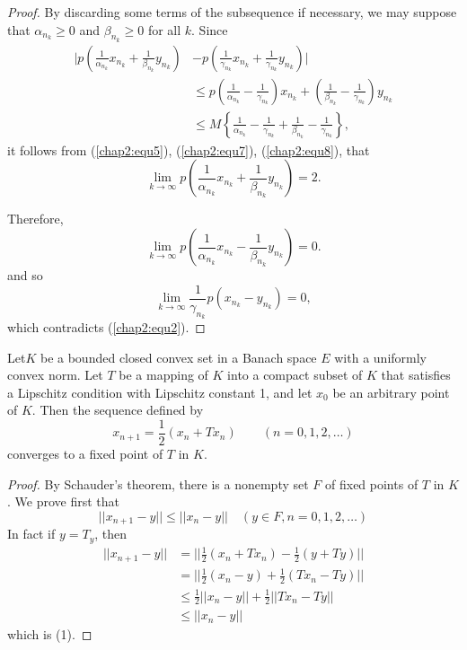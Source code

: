 \begin{proof}
By discarding some terms of the subsequence if necessary, we may
suppose that $\alpha_{n_k} \ge 0$ and $\beta_{n_k} \ge 0$ for all
$k$. Since 
\begin{align*}
\bigg| p \left(\frac{1}{\alpha_{n_k}} x_{n_k} + \frac{1}{\beta_{n_k}} y_{n
  _k} \right) & - p \left(\frac{1}{\gamma_{n_k}} x_{n_k} + \frac{1}{\gamma_{n_k}}
y_{n_k} \right) \bigg| \\
  & \le p \left(\frac{1}{\alpha_{n_k}} - \frac{1}{\gamma_{n_k}} \right) x_{n_k} +
  \left(\frac{1}{\beta_{n_k}} - \frac{1}{\gamma_{ n_k}}\right) y_{n_k}\\ 
  & \le M \left\{ \frac{1}{\alpha_{n_k}} - \frac{1}{\gamma_{n_k}} +
  \frac{1}{\beta_{n_k}} - \frac{1}{\gamma_{n_k}} \right\}, 
\end{align*}
it follows from (\ref{chap2:equ5}), (\ref{chap2:equ7}),
(\ref{chap2:equ8}), that 
$$
\lim_{k \to \infty} p \left(\frac{1}{\alpha_{n_k}} x_{n_k} +
\frac{1}{\beta_{n_k}} y_{n_k} \right) = 2. 
$$

Therefore,
$$
\lim_{k \to \infty} p \left(\frac{1}{\alpha_{n_k}} x_{n_k} -
\frac{1}{\beta_{n_k}} y_{n_k} \right) = 0.
$$
and so
$$
\lim_{k \to \infty} \frac{1}{\gamma_{n_k}} p(x_{n_k} - y_{n_k}) = 
0, 
$$
which contradicts (\ref{chap2:equ2}).
\end{proof}

\begin{thmm}[Krashoselsk\u{u}]\label{chap2:thm2.6}%
  Let\pageoriginale $K$ be a bounded closed convex set in a Banach
  space $E$ with a 
  uniformly convex norm. Let $T$ be a mapping of $K$ into a compact
  subset of $K$ that satisfies a Lipschitz condition with Lipschitz
  constant 1, and let $x_0$ be an arbitrary point of $K$. Then the
  sequence defined by  
  $$
  x_{n + 1} = \frac{1}{2} (x_n + Tx_n) \qquad (n =0, 1,2, \ldots )
  $$
  converges to a fixed point of $T$ in $K$.
\end{thmm}

\begin{proof}
  By Schauder's theorem, there is a nonempty set $F$ of fixed points
  of $T$ in $K$. We prove first that 
  $$
  || x_{n + 1} - y || \le || x_n - y || \quad (y \in F, n = 0, 1,2, \ldots)
  $$
  In fact if $y = T_y$, then
  \begin{align*}
  || x_{n + 1} - y || & = || \frac{1}{2} (x_n + Tx_n) - \frac{1}{2} (y
  + Ty) ||\\ 
    & = || \frac{1}{2} (x_n - y) + \frac{1}{2} (Tx_n - Ty) ||\\
    & \le \frac{1}{2} || x_n - y || + \frac{1}{2} || Tx_n - Ty ||\\
    & \le || x_n - y ||
  \end{align*}
  which is (1).
\end{proof}

